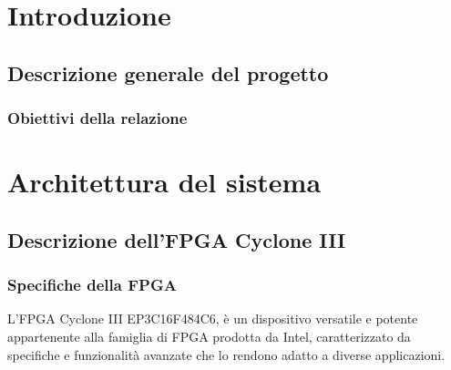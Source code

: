 \documentclass[titlepage]{report}
\begin{document}
  


\begin{frontespizio}
\end{frontespizio}

\tableofcontents
\newpage


\chapter*{Introduzione}
\label{ch:intro}

	\section{Descrizione generale del progetto}
	\label{sec:desc_generale}
		\subsection{Obiettivi della relazione}
		\label{subsec:obiettivi}

\chapter{Architettura del sistema}
\label{ch:architettura}

	\section{Descrizione dell'FPGA Cyclone III}
	\label{sec:fpga}
		
		
		\subsection{Specifiche della FPGA}
		\label{subsec:fpga_specs}
			L'FPGA Cyclone III EP3C16F484C6, è un dispositivo versatile e potente appartenente alla famiglia di FPGA prodotta da Intel, caratterizzato da specifiche e funzionalità avanzate che lo rendono adatto a diverse applicazioni.
\end{document}

